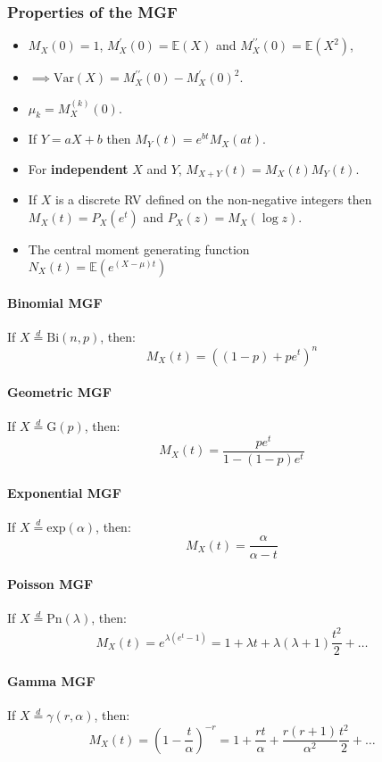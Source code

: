\documentclass[titlepage,twocolumn]{article}
\begin{document}
\subsubsection*{Properties of the MGF}
\begin{itemize}
    \item $M_X(0) = 1$, $M_X^\prime(0) = \mathbb{E}(X)$ and $M_X^{\prime\prime}(0) = \mathbb{E}(X^2)$,
    \item $\implies \mbox{Var}(X) = M_X^{\prime\prime}(0) - M_X^{\prime}(0)^2$.
    \item $\mu_k = M_X^{(k)}(0)$.
    \item If $Y = aX + b$ then $M_Y(t) = e^{bt}M_X(at)$.
    \item For \textbf{independent} $X$ and $Y$, $M_{X+Y}(t) = M_{X}(t)M_{Y}(t)$.
    \item If $X$ is a discrete RV defined on the non-negative integers then $M_X(t) = P_X(e^t)$ and $P_X(z) = M_X(\log z)$.
    \item The central moment generating function\\$N_X(t) = \mathbb{E}\left(e^{(X-\mu)t}\right)$
\end{itemize}
\paragraph{Binomial MGF}
If $X\stackrel{d}{=}\mbox{Bi}(n,p)$, then: $$M_X(t) = ((1-p)+pe^t)^n$$
\paragraph{Geometric MGF}
If $X\stackrel{d}{=}\mbox{G}(p)$, then: $$M_X(t) = \frac{pe^t}{1-(1-p)e^t}$$
\paragraph{Exponential MGF}
If $X\stackrel{d}{=}\mbox{exp}(\alpha)$, then: $$M_X(t) = \frac{\alpha}{\alpha - t}$$
\paragraph{Poisson MGF}
If $X\stackrel{d}{=}\mbox{Pn}(\lambda)$, then: $$M_X(t) = e^{\lambda(e^t-1)} = 1 + \lambda t + \lambda(\lambda + 1)\frac{t^2}{2} + \dots$$
\paragraph{Gamma MGF}
If $X\stackrel{d}{=}\gamma(r,\alpha)$, then: $$M_X(t) = \left( 1- \frac{t}{\alpha} \right)^{-r} = 1 + \frac{rt}{\alpha} + \frac{r(r+1)}{\alpha^2}\frac{t^2}{2} + \dots$$
\end{document}
